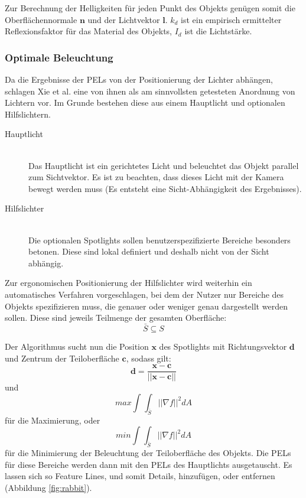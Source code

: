 \documentclass{paperStyle}
\begin{document}
Zur Berechnung der Helligkeiten für jeden Punkt des Objekts genügen somit die Oberflächennormale $\mathbf{n}$ und der Lichtvektor $\mathbf{l}$. $k_{d}$ ist ein empirisch ermittelter Reflexionsfaktor für das Material des Objekts, $I_{d}$ ist die Lichtstärke.

\label{belfkt}
\subsubsection{Optimale Beleuchtung}
Da die Ergebnisse der PELs von der Positionierung der Lichter abhängen, schlagen Xie et al. eine von ihnen als am sinnvollsten getesteten Anordnung von Lichtern vor. Im Grunde bestehen diese aus einem Hauptlicht und optionalen Hilfslichtern.
\begin{description}
\item[Hauptlicht]\hfill \\
Das Hauptlicht ist ein gerichtetes Licht und beleuchtet das Objekt parallel zum Sichtvektor. Es ist zu beachten, dass dieses Licht mit der Kamera bewegt werden muss (Es entsteht eine Sicht-Abhängigkeit des Ergebnisses). 
\item[Hilfslichter]\hfill \\ 
Die optionalen Spotlights sollen benutzerspezifizierte Bereiche besonders betonen. Diese sind lokal definiert und deshalb nicht von der Sicht abhängig.
\end{description}

Zur ergonomischen Positionierung der Hilfslichter wird weiterhin ein automatisches Verfahren vorgeschlagen, bei dem der Nutzer nur Bereiche des Objekts spezifizieren muss, die genauer oder weniger genau dargestellt werden sollen. Diese sind jeweils Teilmenge der gesamten Oberfläche:
\begin{equation}
\bar{S} \subseteq S
\label{eq:ssubsets}
\end{equation}

Der Algorithmus sucht nun die Position $\mathbf{x}$ des Spotlights mit Richtungsvektor $\mathbf{d}$ und Zentrum der Teiloberfläche $\mathbf{c}$, sodass gilt:
\begin{equation}
\mathbf{d} = \frac{\mathbf{x} - \mathbf{c}}{||\mathbf{x} - \mathbf{c}||}
\end{equation}
und
\begin{equation}
max \int_{}\int_{\bar{S}} || \nabla f||^{2} dA 
\end{equation}
für die Maximierung, oder
\begin{equation}
min \int_{}\int_{\bar{S}} || \nabla f||^{2} dA 
\end{equation}
für die Minimierung der Beleuchtung der Teiloberfläche des Objekts. Die PELs für diese Bereiche werden dann mit den PELs des Hauptlichts ausgetauscht. 
Es lassen sich so Feature Lines, und somit Details, hinzufügen, oder entfernen (Abbildung \ref{fig:rabbit}).
\end{document}
